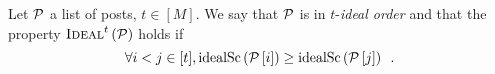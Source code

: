 \begin{definition}
  Let $\mathcal{P}$ a list of posts, $t \in [M]$. We say that $\mathcal{P}$
  is in $t$-\emph{ideal order} and that the property
  $\textsc{Ideal}^{t}\left(\mathcal{P}\right)$ holds if
  \begin{equation*}
    \forall i < j \in [t], \mathrm{idealSc}\left(\mathcal{P}\left[i\right]\right) \geq
    \mathrm{idealSc}\left(\mathcal{P}\left[j\right]\right) \enspace.
  \end{equation*}
\end{definition}
